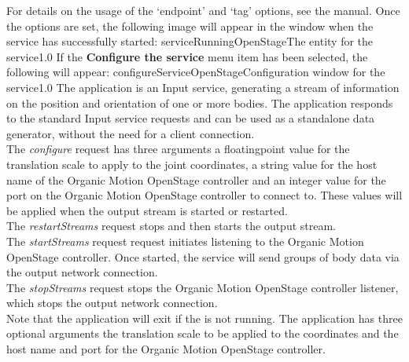 For details on the usage of the `endpoint' and `tag' options, see the \emph{\MMMU} manual.
Once the options are set, the following image will appear in the \emph{\MMMU} window when
the service has successfully started:
%
{serviceRunningOpenStage}{The \emph{\MMMU} entity for the \emph{\OSI} service}{1.0}
\condPage{}
If the \textbf{Configure the service} menu item has been selected, the following will
appear:
%
{configureServiceOpenStage}{Configuration window for the \emph{\OSI} service}{1.0}
\secondaryEnd
\primaryEnd
{}
The  application is an Input service,
generating a stream of information on the position and orientation of one or more bodies.
The application responds to the standard Input service requests and can be used as a
standalone data generator, without the need for a client connection.\\

The \emph{configure} request has three arguments \longDash{} a floating\longDash{}point
value for the translation scale to apply to the joint coordinates, a string value for
the host name of the Organic Motion OpenStage controller and an integer value for the port
on the Organic Motion OpenStage controller to connect to.
These values will be applied when the output stream is started or restarted.\\ 

The \emph{restartStreams} request stops and then starts the output stream.\\

The \emph{startStreams} request request initiates listening to the Organic Motion
OpenStage controller.
Once started, the service will send groups of body data via the output \yarp{} network
connection.\\

The \emph{stopStreams} request stops the Organic Motion OpenStage controller listener,
which stops the output \yarp{} network connection.\\ 

Note that the application will exit if the \emph{\RS} is not running.
The application has three optional arguments \longDash{} the translation scale to be
applied to the coordinates and the host name and port for the Organic Motion OpenStage
controller.
\insertAppParameters
\insertTagDescription{\OSBI}
\insertInputServiceComment\\

